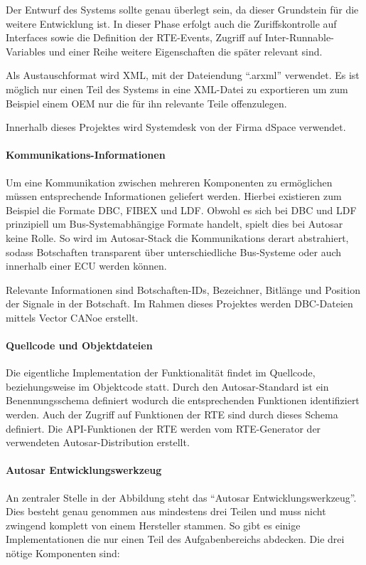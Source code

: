 \documentclass[
  a4paper,					    %
  twoside,
  DIV=calc,     				%
  bibliography=totoc,
  cleardoublepage=empty,
  ngerman,     					%
  final       					%
]{scrbook}
\begin{document}
Der Entwurf des Systems sollte genau überlegt sein, da dieser Grundstein für die weitere Entwicklung ist. In dieser Phase erfolgt auch die Zuriffskontrolle auf Interfaces sowie die Definition der RTE-Events, Zugriff auf Inter-Runnable-Variables und einer Reihe weitere Eigenschaften die später relevant sind.

Als Austauschformat wird XML, mit der Dateiendung "`.arxml"' verwendet. Es ist möglich nur einen Teil des Systems in eine XML-Datei zu exportieren um zum Beispiel einem OEM nur die für ihn relevante Teile offenzulegen.

Innerhalb dieses Projektes wird Systemdesk von der Firma dSpace verwendet.

\paragraph{Kommunikations-Informationen}
Um eine Kommunikation zwischen mehreren Komponenten zu ermöglichen müssen entsprechende Informationen geliefert werden. Hierbei existieren zum Beispiel die Formate DBC, FIBEX und LDF. Obwohl es sich bei DBC und LDF prinzipiell um Bus-Systemabhängige Formate handelt, spielt dies bei Autosar keine Rolle. So wird im Autosar-Stack die Kommunikations derart abstrahiert, sodass Botschaften transparent über unterschiedliche Bus-Systeme oder auch innerhalb einer ECU werden können.

Relevante Informationen sind Botschaften-IDs, Bezeichner, Bitlänge und Position der Signale in der Botschaft. Im Rahmen dieses Projektes werden DBC-Dateien mittels Vector CANoe erstellt.

\paragraph{Quellcode und Objektdateien}
Die eigentliche Implementation der Funktionalität findet im Quellcode, beziehungsweise im Objektcode statt. Durch den Autosar-Standard ist ein Benennungsschema definiert wodurch die entsprechenden Funktionen identifiziert werden. Auch der Zugriff auf Funktionen der RTE sind durch dieses Schema definiert. Die API-Funktionen der RTE werden vom RTE-Generator der verwendeten Autosar-Distribution erstellt. 

\paragraph{Autosar Entwicklungswerkzeug}
An zentraler Stelle in der Abbildung steht das "`Autosar Entwicklungswerkzeug"'. Dies besteht genau genommen aus mindestens drei Teilen und muss nicht zwingend komplett von einem Hersteller stammen. So gibt es einige Implementationen die nur einen Teil des Aufgabenbereichs abdecken. Die drei nötige Komponenten sind:
\end{document}
